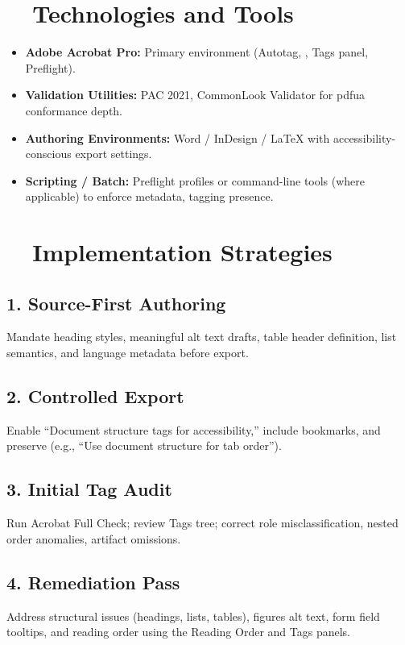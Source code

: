 \section{~~Technologies and Tools}\label{ch17:sec:technologies-tools}
\begin{itemize}
	\item \textbf{Adobe Acrobat Pro:} Primary environment (Autotag, , Tags panel, Preflight).
	\item \textbf{Validation Utilities:} PAC 2021, CommonLook Validator for \gls{pdfua} conformance depth.
	\item \textbf{Authoring Environments:} Word / InDesign / LaTeX with accessibility-conscious export settings.
	\item \textbf{Scripting / Batch:} Preflight profiles or command-line tools (where applicable) to enforce metadata, tagging presence.
\end{itemize}

\section{~~Implementation Strategies}\label{ch17:sec:implementation-strategies}
\subsection*{1. Source-First Authoring}
Mandate heading styles, meaningful alt text drafts, table header definition, list semantics, and language metadata before export.
\subsection*{2. Controlled Export}
Enable “Document structure tags for accessibility,” include bookmarks, and preserve  (e.g., “Use document structure for tab order”).
\subsection*{3. Initial Tag Audit}
Run Acrobat Full Check; review Tags tree; correct role misclassification, nested order anomalies, artifact omissions.
\subsection*{4. Remediation Pass}
Address structural issues (headings, lists, tables), figures alt text, form field tooltips, and reading order using the Reading Order and Tags panels.
